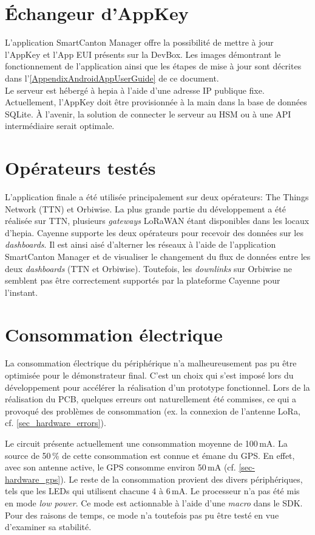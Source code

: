 \section{Échangeur d'AppKey}


L'application SmartCanton Manager offre la possibilité de mettre à jour l'AppKey et l'App EUI présents sur la DevBox. Les images démontrant le fonctionnement de l'application ainsi que les étapes de mise à jour sont décrites dans l'\cref{AppendixAndroidAppUserGuide} de ce document. \\

Le serveur est hébergé à hepia à l'aide d'une adresse IP publique fixe. Actuellement, l'AppKey doit être provisionnée à la main dans la base de données SQLite. À l'avenir, la solution de connecter le serveur au HSM ou à une API intermédiaire serait optimale.


\section{Opérateurs testés}

L'application finale a été utilisée principalement sur deux opérateurs: The Things Network (TTN) et Orbiwise. La plus grande partie du développement a été réalisée sur TTN, plusieurs \textit{gateways} LoRaWAN étant disponibles dans les locaux d'hepia. Cayenne supporte les deux opérateurs pour recevoir des données sur les \textit{dashboards}. Il est ainsi aisé d'alterner les réseaux à l'aide de l'application SmartCanton Manager et de visualiser le changement du flux de données entre les deux \textit{dashboards} (TTN et Orbiwise). Toutefois, les \textit{downlinks} sur Orbiwise ne semblent pas être correctement supportés par la plateforme Cayenne pour l'instant.

\section{Consommation électrique}

La consommation électrique du périphérique n'a malheureusement pas pu être optimisée pour le démonstrateur final. C'est un choix qui s'est imposé lors du développement pour accélérer la réalisation d'un prototype fonctionnel. Lors de la réalisation du PCB, quelques erreurs ont naturellement été commises, ce qui a provoqué des problèmes de consommation (ex. la connexion de l'antenne LoRa, cf. \cref{sec_hardware_errors}).

Le circuit présente actuellement une consommation moyenne de 100\,mA. La source de 50\,\% de cette consommation est connue et émane du GPS. En effet, avec son antenne active, le GPS consomme environ 50\,mA (cf. \cref{sec-hardware_gps}). Le reste de la consommation provient des divers périphériques, tels que les LEDs qui utilisent chacune 4 à 6\,mA. Le processeur n'a pas été mis en mode \textit{low power}. Ce mode est actionnable à l'aide d'une \textit{macro} dans le SDK. Pour des raisons de temps, ce mode n'a toutefois pas pu être testé en vue d'examiner sa stabilité. 



